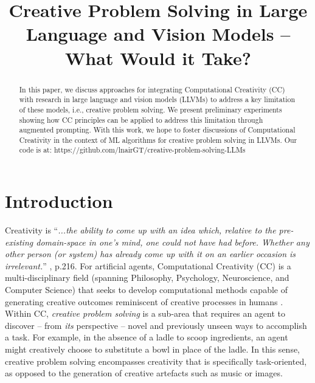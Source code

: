 
\title{Creative Problem Solving in Large Language and Vision Models -- What Would it Take?}
\maketitle

\begin{abstract}
In this paper, we discuss approaches for integrating Computational Creativity (CC) with research in large language and vision models (LLVMs) to address a key limitation of these models, i.e., creative problem solving. We present preliminary experiments showing how CC principles can be applied to address this limitation through augmented prompting. With this work, we hope to foster discussions of Computational Creativity in the context of ML algorithms for creative problem solving in LLVMs. Our code is at: https://github.com/lnairGT/creative-problem-solving-LLMs
\end{abstract}


\section{Introduction}
Creativity is ``\textit{...the ability to come up with an idea which, relative to the pre-existing domain-space in one's mind, one could not have had before. Whether any other person (or system) has already come up with it on an earlier occasion is irrelevant.}'' \cite{boden1998creativity}, p.216. For artificial agents, Computational Creativity (CC) is a multi-disciplinary field (spanning Philosophy, Psychology, Neuroscience, and Computer Science) that seeks to develop computational methods capable of generating creative outcomes reminiscent of creative processes in humans \cite{gizzi2022creative}. Within CC, \textit{creative problem solving} is a sub-area that requires an agent to discover -- from \textit{its} perspective -- novel and previously unseen ways to accomplish a task. For example, in the absence of a ladle to scoop ingredients, an agent might creatively choose to substitute a bowl in place of the ladle. In this sense, creative problem solving encompasses creativity that is specifically task-oriented, as opposed to the generation of creative artefacts such as music or images.




